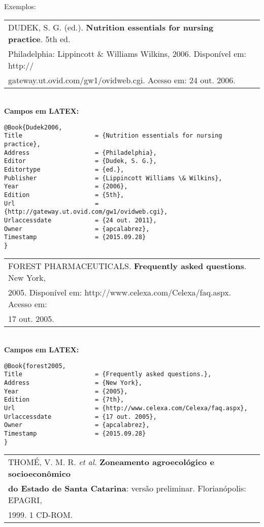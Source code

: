 Exemplos: \\ 

\begin{tabular}{|l|c|} \hline
	DUDEK, S. G. (ed.). \textbf{Nutrition essentials for nursing practice}. 5th ed.\\  Philadelphia: Lippincott \& Williams  Wilkins, 2006. Disponível em: http:// \\gateway.ut.ovid.com/gw1/ovidweb.cgi. Acesso em: 24 out. 2006.  \\\hline
\end{tabular} \\ 

\textbf{Campos em LATEX:} 

\begin{verbatim}
@Book{Dudek2006,
Title                    = {Nutrition essentials for nursing practice},
Address                  = {Philadelphia},
Editor                   = {Dudek, S. G.},
Editortype               = {ed.},
Publisher                = {Lippincott Williams \& Wilkins},
Year                     = {2006},
Edition                  = {5th},
Url                      = {http://gateway.ut.ovid.com/gw1/ovidweb.cgi},
Urlaccessdate            = {24 out. 2011},
Owner                    = {apcalabrez},
Timestamp                = {2015.09.28}
}
\end{verbatim}


\begin{tabular}{|l|c|} \hline
	FOREST PHARMACEUTICALS. \textbf{Frequently asked questions}. New York, \\ 2005. Disponível em:  http://www.celexa.com/Celexa/faq.aspx. Acesso em: \\ 17 out. 2005.   \\\hline
\end{tabular} \\ 

\textbf{Campos em LATEX:} 

\begin{verbatim}
@Book{forest2005,
Title                    = {Frequently asked questions.},
Address                  = {New York},
Year                     = {2005},
Edition                  = {7th},
Url                      = {http://www.celexa.com/Celexa/faq.aspx},
Urlaccessdate            = {17 out. 2005},
Owner                    = {apcalabrez},
Timestamp                = {2015.09.28}
}
\end{verbatim}


\begin{tabular}{|l|c|} \hline
	THOMÉ, V. M. R. \textit{et al.} \textbf{Zoneamento agroecológico e socioeconômico} \\ \textbf{do Estado de Santa Catarina}:  versão preliminar. Florianópolis: EPAGRI, \\
	1999. 1 CD-ROM.  \\\hline
\end{tabular} \\ 

